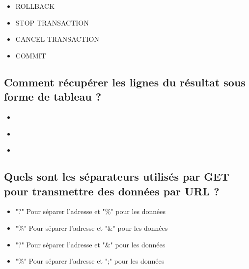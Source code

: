 \documentclass[11pt,a4paper]{article}
\begin{document}
\begin{itemize}
\item[\CaseCoche] ROLLBACK \\
\item[\CaseCoche] STOP TRANSACTION \\
\item[\CaseCoche] CANCEL TRANSACTION \\
\item[\CaseCoche] COMMIT \\
\end{itemize}


\subsection{Comment récupérer les lignes du résultat sous forme de tableau ?}


\bigskip

\begin{itemize}
\item[\CaseCoche]  \\
\item[\CaseCoche]  \\
\item[\CaseCoche]  \\
\end{itemize}

\newpage

\subsection{Quels sont les séparateurs utilisés par GET pour transmettre des données par URL ?}

\begin{itemize}
\item[\CaseCoche] "?" Pour séparer l'adresse et "\%" pour les données \\
\item[\CaseCoche] "\%" Pour séparer l'adresse et "\&" pour les données \\
\item[\CaseCoche] "?" Pour séparer l'adresse et "\&" pour les données \\
\item[\CaseCoche] "\%" Pour séparer l'adresse et ";" pour les données \\
\end{itemize}
\end{document}
